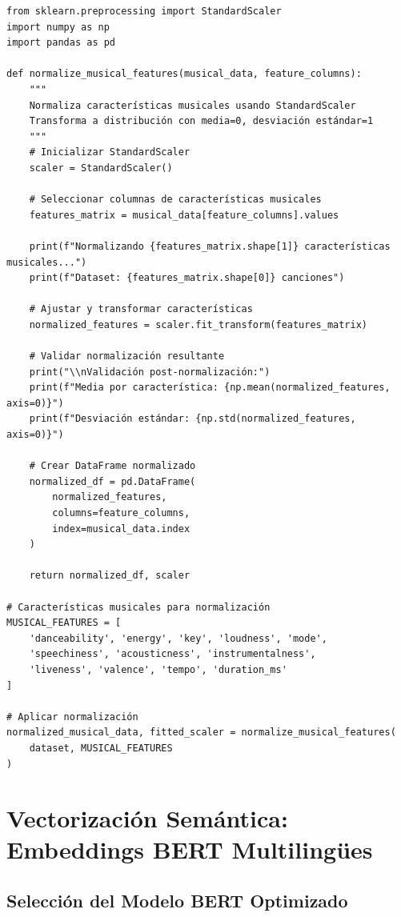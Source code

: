 \documentclass[12pt,a4paper]{report}
\begin{document}
\begin{lstlisting}[caption={Implementación StandardScaler para Normalización Musical}]
from sklearn.preprocessing import StandardScaler
import numpy as np
import pandas as pd

def normalize_musical_features(musical_data, feature_columns):
    """
    Normaliza características musicales usando StandardScaler
    Transforma a distribución con media=0, desviación estándar=1
    """
    # Inicializar StandardScaler
    scaler = StandardScaler()

    # Seleccionar columnas de características musicales
    features_matrix = musical_data[feature_columns].values

    print(f"Normalizando {features_matrix.shape[1]} características musicales...")
    print(f"Dataset: {features_matrix.shape[0]} canciones")

    # Ajustar y transformar características
    normalized_features = scaler.fit_transform(features_matrix)

    # Validar normalización resultante
    print("\\nValidación post-normalización:")
    print(f"Media por característica: {np.mean(normalized_features, axis=0)}")
    print(f"Desviación estándar: {np.std(normalized_features, axis=0)}")

    # Crear DataFrame normalizado
    normalized_df = pd.DataFrame(
        normalized_features,
        columns=feature_columns,
        index=musical_data.index
    )

    return normalized_df, scaler

# Características musicales para normalización
MUSICAL_FEATURES = [
    'danceability', 'energy', 'key', 'loudness', 'mode',
    'speechiness', 'acousticness', 'instrumentalness',
    'liveness', 'valence', 'tempo', 'duration_ms'
]

# Aplicar normalización
normalized_musical_data, fitted_scaler = normalize_musical_features(
    dataset, MUSICAL_FEATURES
)
\end{lstlisting}

\section{Vectorización Semántica: Embeddings BERT Multilingües}

\subsection{Selección del Modelo BERT Optimizado}
\end{document}
